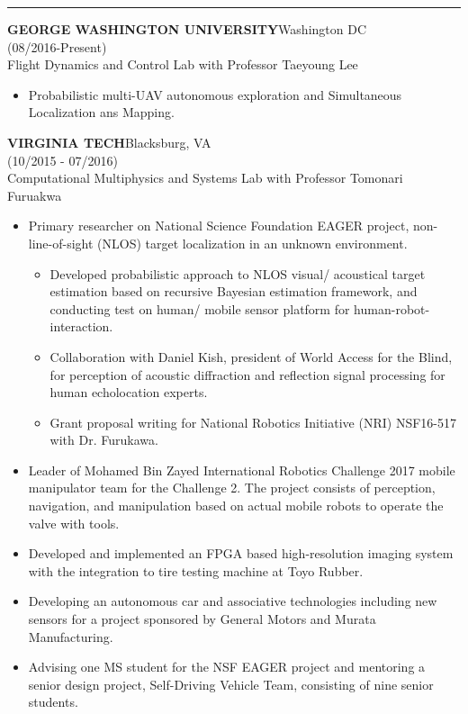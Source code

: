 \documentclass[11pt,letterpaper]{article}
\newcommand{\sect}[1]{\vspace{8mm}{\centering {\bf \large \scshape \uppercase{#1}} \par}  \vskip 2mm   {\color{blue} \hrule height 1pt}\vspace{2mm}}
\begin{document}
  \sect{appointments}
  \MakeUppercase{\bf George Washington University}\hfill{Washington DC}\\
  \hfill {(08/2016-Present)}\\
  Flight Dynamics and Control Lab with Professor Taeyoung Lee\\
  \begin{itemize}
    \item Probabilistic multi-UAV autonomous exploration and Simultaneous Localization ans Mapping.
  \end{itemize}
  \MakeUppercase{\bf Virginia Tech}\hfill{Blacksburg, VA }\\
  \hfill {(10/2015 - 07/2016)}\\
  Computational Multiphysics and Systems Lab with Professor Tomonari Furuakwa\\
  \begin{itemize}
  	\item Primary researcher on National Science Foundation EAGER project, non-line-of-sight (NLOS) target localization in an unknown environment.
  	\begin{itemize}
  		\item Developed probabilistic approach to NLOS visual/ acoustical target estimation based on recursive Bayesian estimation framework, and conducting test on human/ mobile sensor platform for human-robot-interaction.
  		\item Collaboration with Daniel Kish, president of World Access for the Blind, for perception of acoustic diffraction and reflection signal processing for human echolocation experts.
  		\item Grant proposal writing for National Robotics Initiative (NRI) NSF16-517 with Dr. Furukawa.
  	\end{itemize}
  	\item Leader of Mohamed Bin Zayed International Robotics Challenge 2017 mobile manipulator team for the Challenge 2. The project consists of perception, navigation, and manipulation based on actual mobile robots to operate the valve with tools.
  	\item Developed and implemented an FPGA based high-resolution imaging system with the integration to tire testing machine at Toyo Rubber.
  	\item Developing an autonomous car and associative technologies including new sensors for a project sponsored by General Motors and Murata Manufacturing. \item Advising one MS student for the NSF EAGER project and mentoring a senior design project, Self-Driving Vehicle Team, consisting of nine senior students.
  \end{itemize}
\end{document}
